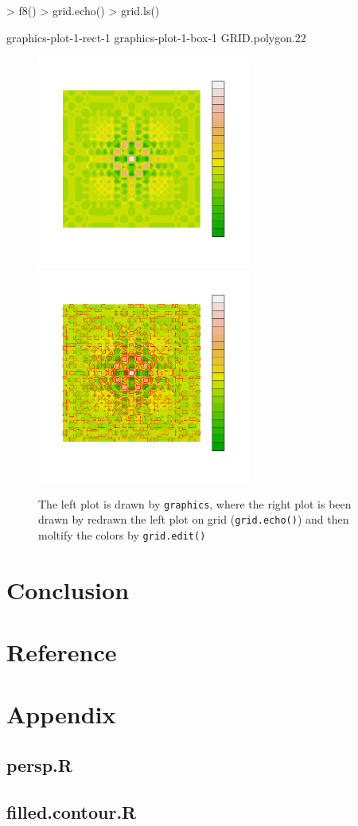 \documentclass[paper=a4, fontsize=11pt]{report}
\begin{document}
\begin{Schunk}
\begin{Sinput}
> f8()
> grid.echo()
> grid.ls()
\end{Sinput}
\begin{Soutput}
graphics-plot-1-rect-1
graphics-plot-1-box-1
GRID.polygon.22
\end{Soutput}
\end{Schunk}



\begin{figure}[h]
\begin{center}
  \includegraphics[height = 7cm, width = 7cm]{figure/Chapter6_example_2_2.pdf}
  \includegraphics[height = 7cm, width = 7cm]{figure/Chapter6_example_2_3.pdf}
  \caption{The left plot is drawn by \texttt{graphics}, where the right plot is been drawn by redrawn the left plot on grid (\texttt{grid.echo()}) and then moltify the colors by \texttt{grid.edit()}}
  	\label{Example_6.1}
\end{center}
\end{figure}


\chapter{Conclusion}
\chapter{Reference}
\chapter{Appendix}
\section{persp.R}
\section{filled.contour.R}
\end{document}
